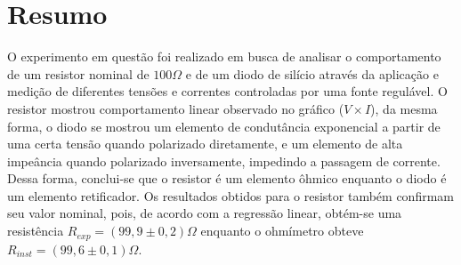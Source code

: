 \section{Resumo}
    O experimento em questão foi realizado em busca de analisar o comportamento de um resistor nominal de $100\Omega$
e de um diodo de silício através da aplicação e medição de diferentes tensões e correntes controladas por uma fonte regulável.
O resistor mostrou comportamento linear observado no gráfico ($V\times I$), da mesma forma,
o diodo se mostrou um elemento de condutância exponencial a partir de uma certa tensão quando polarizado diretamente,
e um elemento de alta impeância quando polarizado inversamente, impedindo a passagem de corrente. Dessa forma, conclui-se que
o resistor é um elemento ôhmico enquanto o diodo é um elemento retificador.
Os resultados obtidos para o resistor também confirmam seu valor nominal, pois, de acordo com a regressão linear,
obtém-se uma resistência $R_{exp}=(99,9\pm 0,2)\Omega$ enquanto o ohmímetro obteve $R_{inst}=(99,6\pm 0,1)\Omega$.
